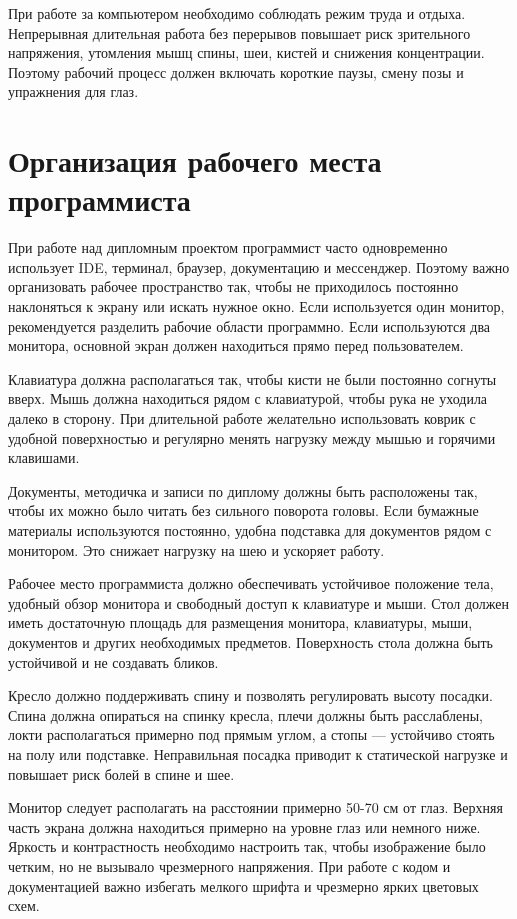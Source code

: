 При работе за компьютером необходимо соблюдать режим труда и отдыха. Непрерывная длительная работа без перерывов повышает риск зрительного напряжения, утомления мышц спины, шеи, кистей и снижения концентрации. Поэтому рабочий процесс должен включать короткие паузы, смену позы и упражнения для глаз.


\section{Организация рабочего места программиста}

При работе над дипломным проектом программист часто одновременно использует IDE, терминал, браузер, документацию и мессенджер. Поэтому важно организовать рабочее пространство так, чтобы не приходилось постоянно наклоняться к экрану или искать нужное окно. Если используется один монитор, рекомендуется разделить рабочие области программно. Если используются два монитора, основной экран должен находиться прямо перед пользователем.


Клавиатура должна располагаться так, чтобы кисти не были постоянно согнуты вверх. Мышь должна находиться рядом с клавиатурой, чтобы рука не уходила далеко в сторону. При длительной работе желательно использовать коврик с удобной поверхностью и регулярно менять нагрузку между мышью и горячими клавишами.


Документы, методичка и записи по диплому должны быть расположены так, чтобы их можно было читать без сильного поворота головы. Если бумажные материалы используются постоянно, удобна подставка для документов рядом с монитором. Это снижает нагрузку на шею и ускоряет работу.


Рабочее место программиста должно обеспечивать устойчивое положение тела, удобный обзор монитора и свободный доступ к клавиатуре и мыши. Стол должен иметь достаточную площадь для размещения монитора, клавиатуры, мыши, документов и других необходимых предметов. Поверхность стола должна быть устойчивой и не создавать бликов.


Кресло должно поддерживать спину и позволять регулировать высоту посадки. Спина должна опираться на спинку кресла, плечи должны быть расслаблены, локти располагаться примерно под прямым углом, а стопы — устойчиво стоять на полу или подставке. Неправильная посадка приводит к статической нагрузке и повышает риск болей в спине и шее.


Монитор следует располагать на расстоянии примерно 50-70 см от глаз. Верхняя часть экрана должна находиться примерно на уровне глаз или немного ниже. Яркость и контрастность необходимо настроить так, чтобы изображение было четким, но не вызывало чрезмерного напряжения. При работе с кодом и документацией важно избегать мелкого шрифта и чрезмерно ярких цветовых схем.


